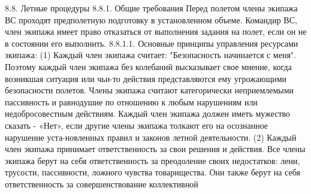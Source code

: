 8.8. Летные процедуры
8.8.1. Общие требования
Перед полетом члены экипажа ВС проходят предполетную подготовку в установленном объеме.
Командир ВС, член экипажа имеет право отказаться от выполнения задания на полет, если он не в состоянии его выполнить.
8.8.1.1. Основные принципы управления ресурсами экипажа:
(1) Каждый член экипажа считает: "Безопасность начинается с меня". Поэтому каждый член экипажа без колебаний высказывает свое мнение, когда возникшая ситуация или чьи-то действия представляются ему угрожающими безопасности полетов. Члены экипажа считают категорически неприемлемыми пассивность и равнодушие по отношению к любым нарушениям или недобросовестным действиям. Каждый член экипажа должен иметь мужество сказать - «Нет», если другие члены экипажа толкают его на осознанное нарушение уста-новленных правил и законов летной деятельности.
(2) Каждый член экипажа принимает ответственность за свои решения и действия. Все члены экипажа берут на себя ответственность за преодоление своих недостатков: лени, трусости, пассивности, ложного чувства товарищества. Они также берут на себя ответственность за совершенствование коллективной

